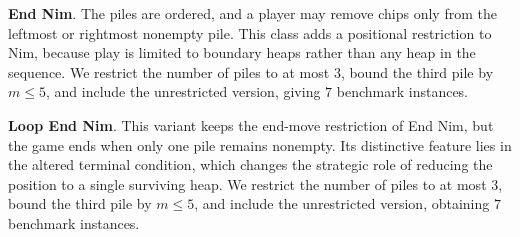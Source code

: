 \documentclass[review]{elsarticle}
\newcommand{\set}[1]{\{ #1 \}}
\newcommand{\tuple}[1]{\langle {#1} \rangle}
\newcommand{\true}{\top}
\newcommand{\statevar}{\mathcal{X}}
\newcommand{\act}{\mathcal{A}}
\newcommand{\constraint}{\mathcal{C}}
\newcommand{\estate}{\mathcal{E}}
\newcommand{\pre}{\mathtt{pre}}
\newcommand{\eff}{\mathtt{eff}}
\begin{document}
{\color{red}\textbf{End Nim}. The piles are ordered, and a player may remove chips only from the leftmost or rightmost nonempty pile.}
{\color{red}This class adds a positional restriction to Nim, because play is limited to boundary heaps rather than any heap in the sequence.}
{\color{red}We restrict the number of piles to at most $3$, bound the third pile by $m \le 5$, and include the unrestricted version, giving $7$ benchmark instances.}

{\color{red}\textbf{Loop End Nim}. This variant keeps the end-move restriction of End Nim, but the game ends when only one pile remains nonempty.}
{\color{red}Its distinctive feature lies in the altered terminal condition, which changes the strategic role of reducing the position to a single surviving heap.}
{\color{red}We restrict the number of piles to at most $3$, bound the third pile by $m \le 5$, and include the unrestricted version, obtaining $7$ benchmark instances.}
\end{document}
